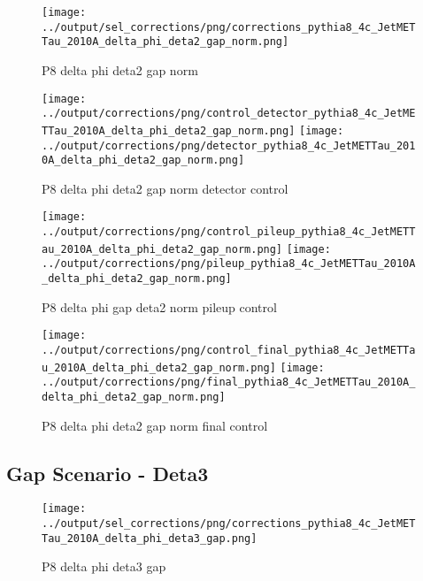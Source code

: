 \documentclass[11pt]{book}
\begin{document}
\begin{figure}[ht]
\centering
\texttt{[image: ../output/sel\_corrections/png/corrections\_pythia8\_4c\_JetMETTau\_2010A\_delta\_phi\_deta2\_gap\_norm.png]}
\caption{P8 delta phi deta2 gap norm}
\label{fig:p8_JetMETTau_2010A_delta_phi_deta2_gap_norm}
\end{figure}


\begin{figure}[ht]
\centering
\texttt{[image: ../output/corrections/png/control\_detector\_pythia8\_4c\_JetMETTau\_2010A\_delta\_phi\_deta2\_gap\_norm.png]}
\texttt{[image: ../output/corrections/png/detector\_pythia8\_4c\_JetMETTau\_2010A\_delta\_phi\_deta2\_gap\_norm.png]}
\caption{P8 delta phi deta2 gap norm detector control}
\label{fig:p8_JetMETTau_2010A_delta_phi_deta2_gap_norm_detector_control}
\end{figure}

\begin{figure}[ht]
\centering
\texttt{[image: ../output/corrections/png/control\_pileup\_pythia8\_4c\_JetMETTau\_2010A\_delta\_phi\_deta2\_gap\_norm.png]}
\texttt{[image: ../output/corrections/png/pileup\_pythia8\_4c\_JetMETTau\_2010A\_delta\_phi\_deta2\_gap\_norm.png]}
\caption{P8 delta phi gap deta2 norm pileup control}
\label{fig:p8_JetMETTau_2010A_delta_phi_deta2_gap_norm_pileup_control}
\end{figure}


\begin{figure}[ht]
\centering
\texttt{[image: ../output/corrections/png/control\_final\_pythia8\_4c\_JetMETTau\_2010A\_delta\_phi\_deta2\_gap\_norm.png]}
\texttt{[image: ../output/corrections/png/final\_pythia8\_4c\_JetMETTau\_2010A\_delta\_phi\_deta2\_gap\_norm.png]}
\caption{P8 delta phi deta2 gap norm final control}
\label{fig:p8_JetMETTau_2010A_delta_phi_deta2_gap_norm_final_control}
\end{figure}


\clearpage
\subsection{Gap Scenario - Deta3}

\begin{figure}[ht]
\centering
\texttt{[image: ../output/sel\_corrections/png/corrections\_pythia8\_4c\_JetMETTau\_2010A\_delta\_phi\_deta3\_gap.png]}
\caption{P8 delta phi deta3 gap}
\label{fig:p8_JetMETTau_2010A_delta_phi_deta3_gap}
\end{figure}
\end{document}
